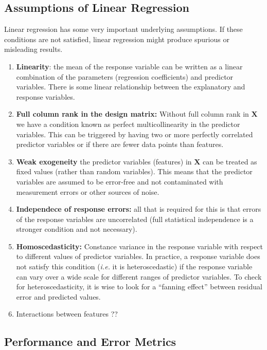 \documentclass[11pt]{article}
\begin{document}
\subsection*{Assumptions of Linear Regression}
Linear regression has some very important underlying assumptions. 
If these conditions are not satisfied, linear regression might produce spurious
or misleading results.
\begin{enumerate}
\item {\bf Linearity}: the mean of the response variable can be written as a
linear combination of the parameters (regression coefficients) and predictor
variables.  There is some linear relationship between the explanatory and
response variables.
\item {\bf Full column rank in the design matrix:} 
Without full column rank in $\mathbf{X}$ we have a condition known as perfect
multicollinearity in the predictor variables. This can be triggered by having
two or more perfectly correlated predictor variables or if there are fewer data
points than features.
\item {\bf Weak exogeneity} the predictor variables (features) in $\mathbf{X}$
can be treated as fixed values (rather than random variables).  This means that
the predictor variables are assumed to be error-free and not contaminated with
measurement errors or other sources of noise.
\item {\bf Independece of response errors:} all that is required for this is
that errors of the response variables are uncorrelated (full statistical
independence is a stronger condition and not necessary).
\item {\bf Homoscedasticity:} Constance variance in the response variable with respect to different values of predictor variables.
In practice, a response variable does not satisfy this condition (\textit{i.e.}
it is heteroscedastic) if the response variable can vary over a wide scale for
different ranges of predictor variables. 
To check for heteroscedasticity, it is wise to look for a ``fanning effect''
between residual error and predicted values.
\item Interactions between features ??
\end{enumerate}

\subsection*{Performance and Error Metrics}

\newpage
\end{document}
